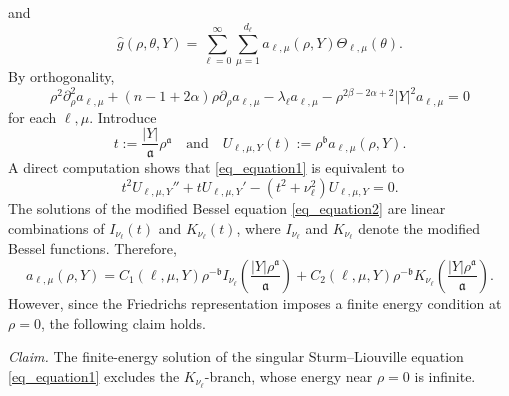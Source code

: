 \documentclass[12pt]{amsart}
\begin{document}
and
\begin{equation}\label{eq_spherical_decom}
    \hat{g}(\rho,\theta,Y) = \sum_{\ell=0}^\infty \sum_{\mu=1}^{d_\ell} a_{\ell,\mu}(\rho,Y) \Theta_{\ell,\mu}(\theta).
\end{equation}
By orthogonality,
\begin{equation}\label{eq_equation1}
    \rho^{2} \partial_\rho^2 a_{\ell,\mu} + (n-1+2\alpha) \rho \partial_\rho a_{\ell,\mu} -  \lambda_{\ell} a_{\ell,\mu} - \rho^{2\beta-2\alpha+2} |Y|^2 a_{\ell,\mu} = 0
\end{equation}
for each $\ell,\mu$. Introduce
\begin{equation*}
    t:= \frac{|Y|}{\mathfrak a} \rho^{\mathfrak a}
    \quad \textrm{and}\quad
    U_{\ell,\mu,Y}(t):= \rho^{\mathfrak b} a_{\ell,\mu}(\rho,Y).
\end{equation*}
A direct computation shows that \eqref{eq_equation1} is equivalent to
\begin{equation}\label{eq_equation2}
    t^2 U_{\ell,\mu,Y}'' + t U_{\ell,\mu,Y}' - \left( t^2 + \nu_\ell^2 \right)U_{\ell,\mu,Y} = 0.
\end{equation}
The solutions of the modified Bessel equation \eqref{eq_equation2} are linear combinations of $I_{\nu_\ell}(t)$ and $K_{\nu_\ell}(t)$, where $I_{\nu_\ell}$ and $K_{\nu_\ell}$ denote the modified Bessel functions. Therefore,
\begin{equation}\label{a_l,mu}
    a_{\ell,\mu}(\rho,Y) = C_1(\ell,\mu,Y) \rho^{-\mathfrak b} I_{\nu_\ell}\left( \frac{|Y| \rho^{\mathfrak a}}{\mathfrak a} \right) + C_2(\ell,\mu,Y) \rho^{-\mathfrak b} K_{\nu_\ell}\left( \frac{|Y| \rho^{\mathfrak a}}{\mathfrak a} \right).
\end{equation}
However, since the Friedrichs representation imposes a finite energy condition at $\rho=0$, the following claim holds.

\textit{Claim.} The finite-energy solution of the singular Sturm--Liouville equation \eqref{eq_equation1} excludes the $K_{\nu_\ell}$-branch, whose energy near $\rho=0$ is infinite.
\end{document}
